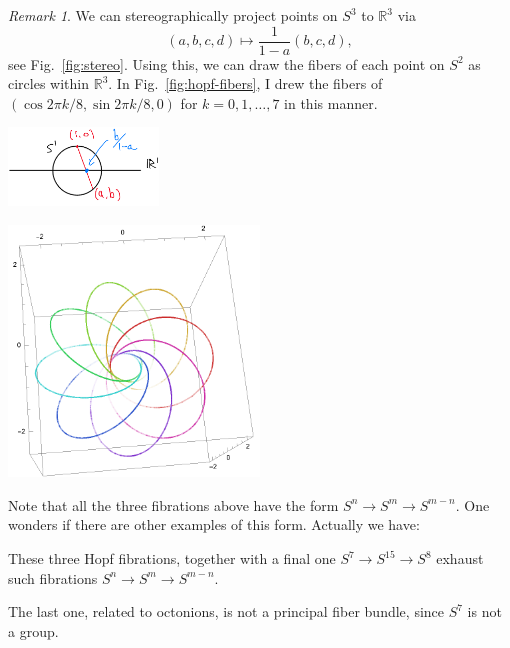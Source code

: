 \documentclass[12pt]{article}
\numberwithin{equation}{section}
\numberwithin{figure}{section}
\theoremstyle{remark}
\newtheorem{remark}[definition]{Remark}
\renewenvironment{figure}[1][]{
  \begin{originalfigure}[#1]
    \begin{mdframed}[linecolor=black!0,backgroundcolor=black!1]
}{
    \end{mdframed}
  \end{originalfigure}
}
\def\bR{\mathbb{R}}
\begin{document}
\begin{remark}
We can stereographically project points on $S^3$ to $\bR^3$ via \begin{equation}
(a,b,c,d) \mapsto \frac{1}{1-a}(b,c,d),
\end{equation} see Fig.~\ref{fig:stereo}.
Using this, we can draw the fibers of each point on $S^2$ as circles within $\bR^3$.
In Fig.~\ref{fig:hopf-fibers}, I drew the fibers of $(\cos 2\pi k/8, \sin 2\pi k/8, 0)$ for $k=0,1,\ldots,7$ in this manner.
\begin{figure}[h]
\centering   
\includegraphics[width=0.3\textwidth]{stereo.png}
  \caption{Stereographical projection from $S^3$ to $\bR^3$}
  \label{fig:stereo}
\end{figure}
\begin{figure}[h]
\centering   
\includegraphics[width=0.5\textwidth]{hopf-fibers.png}
  \caption{Fibers of the Hopf fibration, drawn after a stereographic projection.}
  \label{fig:hopf-fibers}
\end{figure}
\end{remark}


Note that all the three fibrations above have the form
$S^n \to S^m \to S^{m-n}$.
One wonders if there are other examples of this form.
Actually we have:
\begin{fact}
These three Hopf fibrations, together with a final one
$S^7\to S^{15}\to S^8$
 exhaust 
such fibrations $S^n\to S^m\to S^{m-n}$.
\end{fact}
The last one, related to octonions, is not a principal fiber bundle, since $S^7$ is not a group.
\end{document}
